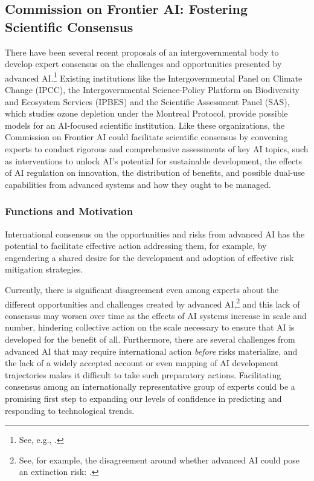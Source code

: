 \documentclass[12pt]{article}
\begin{document}
\subsection{Commission on Frontier AI: Fostering
Scientific Consensus
}

There have been several recent proposals of an intergovernmental body to
develop expert consensus on the challenges and opportunities presented
by advanced AI.\footnote{See, e.g., \cite{rees_g20_2023, mailhe_why_2018}.}
Existing institutions like the Intergovernmental Panel on Climate
Change (IPCC), the Intergovernmental Science-Policy Platform on
Biodiversity and Ecosystem Services (IPBES) and the Scientific Assessment
Panel (SAS), which studies ozone depletion under the Montreal Protocol,
provide possible models for an AI-focused scientific institution. Like
these organizations, the Commission on Frontier AI could facilitate
scientific consensus by convening experts to conduct rigorous and
comprehensive assessments of key AI topics, such as interventions to
unlock AI's potential for sustainable development, the effects of AI
regulation on innovation, the distribution of benefits, and possible
dual-use capabilities from advanced systems and how they ought to be
managed.


\subsubsection*{Functions and
Motivation}

International consensus on the opportunities and risks from advanced AI
has the potential to facilitate effective action addressing them, for
example, by engendering a shared desire for the development and adoption
of effective risk mitigation strategies.

Currently, there is significant disagreement even among experts about
the different opportunities and challenges created by advanced
AI,\footnote{See, for example, the disagreement around whether advanced
AI could pose an extinction risk: \cite{noauthor_statement_2023, noauthor_editorial_2023}.}
and this lack of consensus may worsen over time as the effects of AI
systems increase in scale and number, hindering collective action on the
scale necessary to ensure that AI is developed for the benefit of all.
Furthermore, there are several challenges from advanced AI that may
require international action \emph{before} risks materialize, and the lack of a widely accepted
account or even mapping of AI development trajectories makes it
difficult to take such preparatory actions. Facilitating consensus among
an internationally representative group of experts could be a promising
first step to expanding our levels of confidence in predicting and responding to
technological trends.
\end{document}
